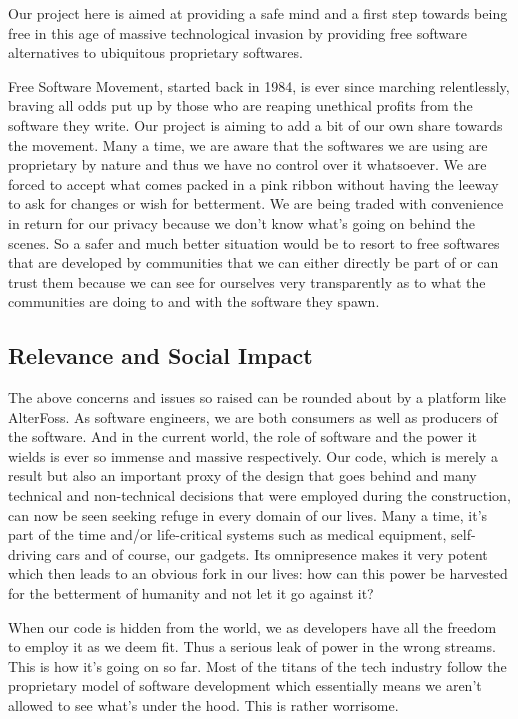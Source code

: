 Our project here is aimed at providing a safe mind and a first step towards being free in this age of massive technological invasion by providing free software alternatives to ubiquitous proprietary softwares.

Free Software Movement\cite{FSF}, started back in 1984, is ever since marching relentlessly, braving all odds put up by those who are reaping unethical profits from the software they write. Our project is aiming to add a bit of our own share towards the movement. Many a time, we are aware that the softwares we are using are proprietary by nature and thus we have no control over it whatsoever. We are forced to accept what comes packed in a pink ribbon without having the leeway to ask for changes or wish for betterment. We are being traded with convenience in return for our privacy because we don’t know what’s going on behind the scenes. So a safer and much better situation would be to resort to free softwares that are developed by communities that we can either directly be part of or can trust them because we can see for ourselves very transparently as to what the communities are doing to and with the software they spawn.

\subsection{Relevance and Social Impact}
The above concerns and issues so raised can be rounded about by a platform like AlterFoss. As software engineers, we are both consumers as well as producers of the software. And in the current world, the role of software and the power it wields is ever so immense and massive respectively. Our code, which is merely a result but also an important proxy of the design that goes behind and many technical and non-technical decisions that were employed during the construction, can now be seen seeking refuge in every domain of our lives. Many a time, it’s part of the time and/or life-critical systems such as medical equipment, self-driving cars and of course, our gadgets. Its omnipresence makes it very potent which then leads to an obvious fork in our lives: how can this power be harvested for the betterment of humanity and not let it go against it?

When our code is hidden from the world, we as developers have all the freedom to employ it as we deem fit. Thus a serious leak of power in the wrong streams. This is how it’s going on so far. Most of the titans of the tech industry follow the proprietary model of software development which essentially means we aren’t allowed to see what’s under the hood. This is rather worrisome.

